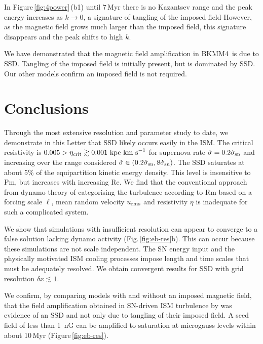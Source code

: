 \documentclass[preprint2]{aastex63}
\newcommand\SNr{\dot\sigma_{\rm sn}}
\newcommand\kpc{~ {\rm kpc}}
\newcommand\dx{ {\delta x}}
\newcommand\kms{~ {\rm km~ s}^{-1}}
\newcommand\BKM{{\sf BKMM4}}
\begin{document}
{ In Figure\,\ref{fig:4power}\,(b1) {until 7\,Myr there is no Kazantsev range
 and the peak energy increases as $k\rightarrow0$, a signature of tangling of
 the imposed field
 However, as the magnetic field grows much larger than the imposed field,
 this signature disappears and the peak shifts to high $k$.}
 
 {We have demonstrated that the magnetic field amplification in \BKM\ is
 due to SSD. 
 Tangling of the imposed field is {initially} present, but is
 dominated by SSD. {O}ur other models 
 confirm an imposed field is not required.
 }

\section{Conclusions}\label{sec:conc}

 {Through the most extensive resolution and parameter study to date, we
   demonstrate in this Letter that SSD
{likely occurs easily}
 in the ISM.
 The critical resistivity is $0.005>\eta_{\rm crit}\gtrsim0.001\kpc\kms$ for 
 supernova rate $\dot \sigma=0.2\SNr$ and increasing over the 
 range considered $\dot \sigma\in(0.2\SNr,8\SNr)$.
 The SSD
 saturates at about 5\% of the equipartition kinetic energy
 density.
 This level is insensitive to Pm, but increases with increasing Re.}
 We find that the conventional approach from dynamo theory of categorising the 
 turbulence according to Rm based on a forcing scale $\ell$, mean random
 velocity $u_{\rm rms}$ and resistivity $\eta$ is inadequate for such a
 complicated system.

 We show that simulations with insufficient resolution can appear to
 converge to a false solution lacking dynamo activity
 (Fig.\,\ref{fig:eb-res}b). This can occur because these simulations are not
 scale independent. 
 The SN energy input and the physically motivated ISM cooling processes impose
 length and time scales that must be adequately resolved.
 {We obtain convergent results for SSD with grid resolution
 $\dx\lesssim1$.}

{We confirm,
  by comparing models with and without an imposed magnetic field,
 that the field amplification obtained in SN-driven ISM turbulence by
 \citet{BKMM04}
 was evidence of an SSD and not only due to tangling of their imposed field.}
 A seed field of less than 1~nG can be amplified to saturation at microgauss
 levels within about 10\,Myr (Figure\,\ref{fig:eb-res}). 

}
\end{document}
